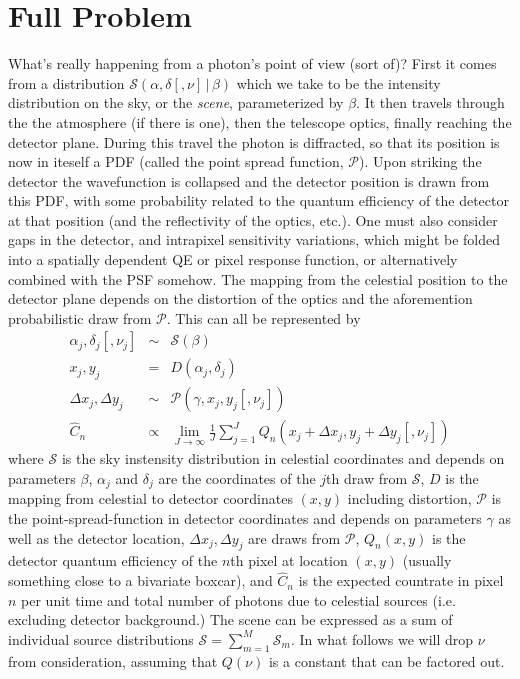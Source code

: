 \documentclass[modern]{aastex6}
\newcommand{\given}{\,|\,}
\newcommand{\countrate}{\hat{C}}
\newcommand{\psf}{\mathcal{P}}
\newcommand{\qe}{Q}
\newcommand{\scene}{\mathcal{S}}
\begin{document}
\section{Full Problem}
What's really happening from a photon's point of view (sort of)?
First it comes from a distribution $\scene(\alpha, \delta [, \nu] \given \beta)$ which we take to be the intensity distribution on the sky, or the \emph{scene},
parameterized by $\beta$.
It then travels through the the atmosphere (if there is one), then the telescope optics, finally reaching the detector plane.
During this travel the photon is diffracted, so that its position is now in iteself a PDF (called the point spread function, $\psf$).
Upon striking the detector the wavefunction is collapsed and the detector position is drawn from this PDF, 
with some probability related to the quantum efficiency of the detector at that position (and the reflectivity of the optics, etc.).
One must also consider gaps in the detector, and intrapixel sensitivity variations, which might be folded into a spatially dependent QE or pixel response function, 
or alternatively combined with the PSF somehow.
The mapping from the celestial position to the detector plane depends on the distortion of the optics and the aforemention probabilistic draw from $\psf$.
This can all be represented by 
\begin{eqnarray}
\label{eqn:photon}
\alpha_j, \delta_j [, \nu_j] & \sim & \scene(\beta)\\
x_j, y_j & = & D(\alpha_j, \delta_j)  \nonumber \\ 
\Delta x_j, \Delta y_j & \sim & \psf(\gamma, x_j, y_j [, \nu_j]) \nonumber \\
\countrate_n & \propto & \lim_{J\to\infty} \frac{1}{J} \sum^J_{j=1} \qe_n(x_j+ \Delta x_j, y_j + \Delta y_j [, \nu_j]) \nonumber
\end{eqnarray}
where $\scene$ is the sky instensity distribution in celestial coordinates 
and depends on parameters $\beta$,
$\alpha_j$ and $\delta_j$ are the coordinates of the $j$th draw from $\scene$,
$D$ is the mapping from celestial to detector coordinates $(x, y)$ including distortion,
$\psf$ is the point-spread-function in detector coordinates and depends on parameters $\gamma$ as well as the detector location,
$\Delta x_j, \Delta y_j$ are draws from $\psf$,
$\qe_n(x, y)$ is the detector quantum efficiency of the $n$th pixel at location $(x, y)$ (usually something close to a bivariate boxcar),
and $\countrate_n$ is the expected countrate in pixel $n$ per unit time and total number of photons due to celestial sources (i.e. excluding detector background.)
The scene can be expressed as a sum of individual source distributions $\scene = \sum_{m=1}^M \scene_m$.
In what follows we will drop $\nu$ from consideration, assuming that $\qe(\nu)$ is a constant that can be factored out.
\end{document}
